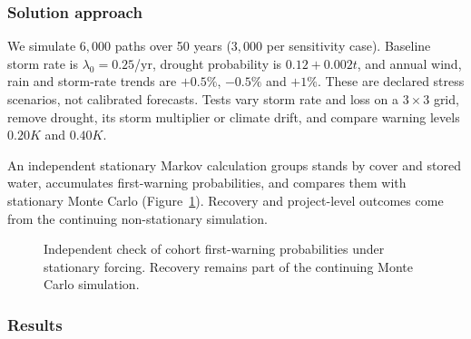 \subsubsection[Monte Carlo Stress Tests and Markov Verification]{Solution approach}
We simulate $6{,}000$ paths over 50 years ($3{,}000$ per sensitivity case). Baseline storm rate is $\lambda_0=0.25$/yr, drought probability is $0.12+0.002t$, and annual wind, rain and storm-rate trends are $+0.5\%$, $-0.5\%$ and $+1\%$. These are declared stress scenarios, not calibrated forecasts. Tests vary storm rate and loss on a $3\times3$ grid, remove drought, its storm multiplier or climate drift, and compare warning levels $0.20K$ and $0.40K$.

An independent stationary Markov calculation groups stands by cover and stored water, accumulates first-warning probabilities, and compares them with stationary Monte Carlo (Figure~\ref{fig:m3-check}). Recovery and project-level outcomes come from the continuing non-stationary simulation.

\begin{figure}[!htb]
\centering
{}
\caption{Independent check of cohort first-warning probabilities under stationary forcing. Recovery remains part of the continuing Monte Carlo simulation.}
\label{fig:m3-check}
\end{figure}

\subsubsection[Warning Risk, Vegetation Recovery, and Water Limits]{Results}
